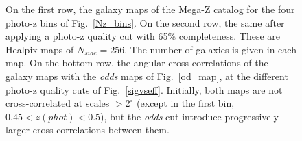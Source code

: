 \begin{figure}
\centering
{}
\caption{On the first row, the galaxy maps of the Mega-Z catalog for the four photo-z bins of Fig.~\ref{Nz_bins}. On the second row, the same after applying a photo-z quality cut with 65\% completeness. These are Healpix maps of $N_{side}=256$. The number of galaxies is given in each map. 
On the bottom row, the angular cross correlations of the galaxy maps with the \textit{odds} maps of Fig.~\ref{od_map}, at the different photo-z quality cuts of Fig.~\ref{sigvseff}. Initially, both maps are not cross-correlated at scales $>2^\circ$ (except in the first bin, $0.45<z(phot)<0.5$), but the {\it odds} cut introduce progressively larger cross-correlations between them.}
\label{gal_map}
\end{figure}
